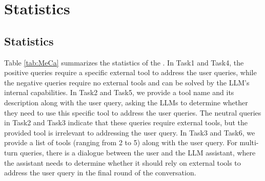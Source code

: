 \onecolumn
\section{\dname Statistics}\label{app:sec:meca}

\subsection{\dname Statistics}
Table \ref{tab:MeCa} summarizes the statistics of the \dname. In Task1 and Task4, the positive queries require a specific external tool to address the user queries, while the negative queries require no external tools and can be solved by the LLM's internal capabilities. In Task2 and Task5, we provide a tool name and its description along with the user query, asking the LLMs to determine whether they need to use this specific tool to address the user queries. The neutral queries in Task2 and Task3 indicate that these queries require external tools, but the provided tool is irrelevant to addressing the user query. In Task3 and Task6, we provide a list of tools (ranging from 2 to 5) along with the user query. For multi-turn queries, there is a dialogue between the user and the LLM assistant, where the assistant needs to determine whether it should rely on external tools to address the user query in the final round of the conversation.

